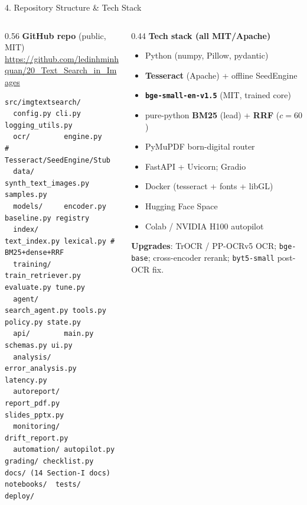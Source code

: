 \documentclass[10pt,aspectratio=169]{beamer}
\begin{document}
\begin{frame}[fragile]{4. Repository Structure \& Tech Stack}
\begin{columns}[T]
\begin{column}{0.56\textwidth}
\textbf{GitHub repo} (public, MIT) \\
\scriptsize \url{https://github.com/ledinhminhquan/20_Text_Search_in_Images}

\vspace{0.12cm}
\begin{lstlisting}[basicstyle=\ttfamily\tiny]
src/imgtextsearch/
  config.py cli.py logging_utils.py
  ocr/        engine.py    # Tesseract/SeedEngine/Stub
  data/       synth_text_images.py samples.py
  models/     encoder.py baseline.py registry
  index/      text_index.py lexical.py # BM25+dense+RRF
  training/   train_retriever.py evaluate.py tune.py
  agent/      search_agent.py tools.py policy.py state.py
  api/        main.py schemas.py ui.py
  analysis/   error_analysis.py latency.py
  autoreport/ report_pdf.py slides_pptx.py
  monitoring/ drift_report.py
  automation/ autopilot.py   grading/ checklist.py
docs/ (14 Section-I docs)  notebooks/  tests/  deploy/
\end{lstlisting}
\end{column}
\begin{column}{0.44\textwidth}
\textbf{Tech stack (all MIT/Apache)}
\begin{itemize}\scriptsize
  \item Python (numpy, Pillow, pydantic)
  \item \textbf{Tesseract} (Apache) + offline SeedEngine
  \item \textbf{\texttt{bge-small-en-v1.5}} (MIT, trained core)
  \item pure-python \textbf{BM25} (lead) + \textbf{RRF} ($c{=}60$)
  \item PyMuPDF born-digital router
  \item FastAPI + Uvicorn; Gradio
  \item Docker (tesseract + fonts + libGL)
  \item Hugging Face Space
  \item Colab / NVIDIA H100 autopilot
\end{itemize}
\textbf{Upgrades}: TrOCR / PP-OCRv5 OCR; \texttt{bge-base}; cross-encoder rerank; \texttt{byt5-small} post-OCR fix.
\end{column}
\end{columns}
\end{frame}
\end{document}
